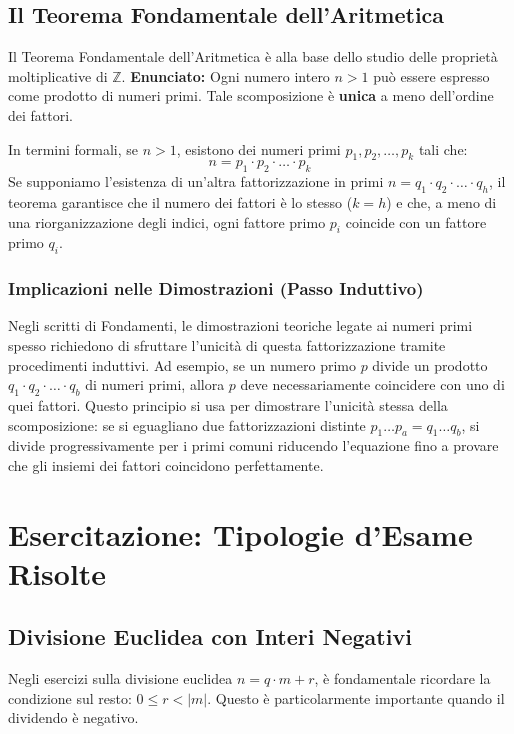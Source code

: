 \documentclass[12pt, a4paper]{article}
\begin{document}
\subsection{Il Teorema Fondamentale dell'Aritmetica}
Il Teorema Fondamentale dell'Aritmetica è alla base dello studio delle proprietà moltiplicative di $\mathbb{Z}$.
\textbf{Enunciato:} Ogni numero intero $n > 1$ può essere espresso come prodotto di numeri primi. Tale scomposizione è \textbf{unica} a meno dell'ordine dei fattori.

In termini formali, se $n > 1$, esistono dei numeri primi $p_1, p_2, \dots, p_k$ tali che:
\[ n = p_1 \cdot p_2 \cdot \dots \cdot p_k \]
Se supponiamo l'esistenza di un'altra fattorizzazione in primi $n = q_1 \cdot q_2 \cdot \dots \cdot q_h$, il teorema garantisce che il numero dei fattori è lo stesso ($k = h$) e che, a meno di una riorganizzazione degli indici, ogni fattore primo $p_i$ coincide con un fattore primo $q_i$.

\subsubsection*{Implicazioni nelle Dimostrazioni (Passo Induttivo)}
Negli scritti di Fondamenti, le dimostrazioni teoriche legate ai numeri primi spesso richiedono di sfruttare l'unicità di questa fattorizzazione tramite procedimenti induttivi. 
Ad esempio, se un numero primo $p$ divide un prodotto $q_1 \cdot q_2 \cdot \dots \cdot q_b$ di numeri primi, allora $p$ deve necessariamente coincidere con uno di quei fattori. Questo principio si usa per dimostrare l'unicità stessa della scomposizione: se si eguagliano due fattorizzazioni distinte $p_1 \dots p_a = q_1 \dots q_b$, si divide progressivamente per i primi comuni riducendo l'equazione fino a provare che gli insiemi dei fattori coincidono perfettamente.


\section{Esercitazione: Tipologie d'Esame Risolte}

\subsection{Divisione Euclidea con Interi Negativi}
Negli esercizi sulla divisione euclidea $n = q \cdot m + r$, è fondamentale ricordare la condizione sul resto: $0 \le r < |m|$. Questo è particolarmente importante quando il dividendo è negativo.
\end{document}
